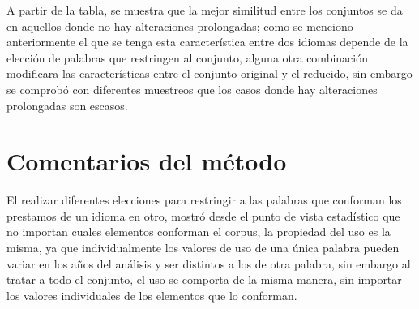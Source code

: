 A partir de la tabla, se muestra que la mejor similitud entre los conjuntos se da en aquellos donde no hay alteraciones prolongadas; como se menciono anteriormente el que se tenga esta característica entre dos idiomas depende de la elección de palabras que restringen al conjunto, alguna otra combinación modificara las características entre  el conjunto original y el reducido, sin embargo se comprobó con diferentes muestreos que los casos donde hay alteraciones prolongadas son escasos.


\section{Comentarios del método}

El realizar diferentes elecciones para restringir a las palabras que conforman los prestamos de un idioma en otro, mostró desde el punto de vista estadístico que no importan cuales elementos conforman el corpus, la propiedad del uso es la misma, ya que individualmente los valores de uso de una única palabra pueden variar en los años del análisis y ser distintos a los de otra palabra, sin embargo al tratar a todo el conjunto, el uso se comporta de la misma  manera, sin importar los valores individuales de los elementos que lo conforman. 







